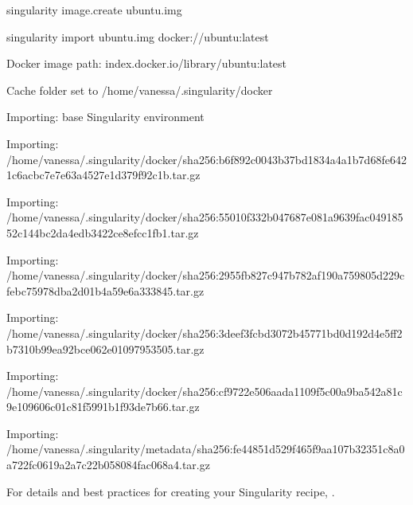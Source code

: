 \documentclass[letterpaper,10pt,english]{sphinxmanual}
\begin{document}
%
\begin{sphinxVerbatim}[commandchars=\\\{\}]
\PYGZdl{} singularity image.create ubuntu.img

singularity import ubuntu.img docker://ubuntu:latest

Docker image path: index.docker.io/library/ubuntu:latest

Cache folder set to /home/vanessa/.singularity/docker

Importing: base Singularity environment

Importing: /home/vanessa/.singularity/docker/sha256:b6f892c0043b37bd1834a4a1b7d68fe6421c6acbc7e7e63a4527e1d379f92c1b.tar.gz

Importing: /home/vanessa/.singularity/docker/sha256:55010f332b047687e081a9639fac04918552c144bc2da4edb3422ce8efcc1fb1.tar.gz

Importing: /home/vanessa/.singularity/docker/sha256:2955fb827c947b782af190a759805d229cfebc75978dba2d01b4a59e6a333845.tar.gz

Importing: /home/vanessa/.singularity/docker/sha256:3deef3fcbd3072b45771bd0d192d4e5ff2b7310b99ea92bce062e01097953505.tar.gz

Importing: /home/vanessa/.singularity/docker/sha256:cf9722e506aada1109f5c00a9ba542a81c9e109606c01c81f5991b1f93de7b66.tar.gz

Importing: /home/vanessa/.singularity/metadata/sha256:fe44851d529f465f9aa107b32351c8a0a722fc0619a2a7c22b058084fac068a4.tar.gz
\end{sphinxVerbatim}

For details and best practices for creating your Singularity recipe, .



\renewcommand{\indexname}{Index}
\printindex
\end{document}
